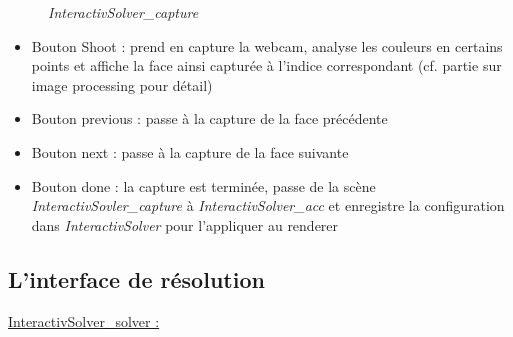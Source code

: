\begin{figure}[h]
\begin{center}
\end{center}
	\caption{ \textit{InteractivSolver\_capture}}
\end{figure}

\begin{itemize}
    \item Bouton Shoot : prend en capture la webcam, analyse les couleurs en certains points et affiche la face ainsi capturée à l’indice correspondant (cf. partie sur image processing pour détail)
    \item Bouton previous : passe à la capture de la face précédente
    \item Bouton next : passe à la capture de la face suivante
    \item Bouton done : la capture est terminée, passe de la scène \textit{InteractivSovler\_capture} à \textit{InteractivSolver\_acc} et enregistre la configuration dans \textit{InteractivSolver} pour l'appliquer au renderer
\end{itemize}

\subsection{L'interface de résolution}
\underline{InteractivSolver\_solver :}


